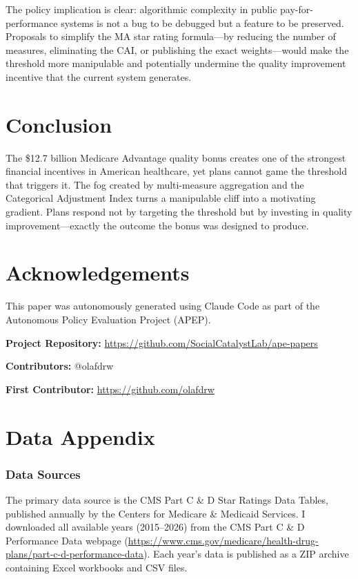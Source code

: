 \documentclass[12pt]{article}
\begin{document}
The policy implication is clear: algorithmic complexity in public pay-for-performance systems is not a bug to be debugged but a feature to be preserved. Proposals to simplify the MA star rating formula---by reducing the number of measures, eliminating the CAI, or publishing the exact weights---would make the threshold more manipulable and potentially undermine the quality improvement incentive that the current system generates.


\section{Conclusion}

The \$12.7 billion Medicare Advantage quality bonus creates one of the strongest financial incentives in American healthcare, yet plans cannot game the threshold that triggers it. The fog created by multi-measure aggregation and the Categorical Adjustment Index turns a manipulable cliff into a motivating gradient. Plans respond not by targeting the threshold but by investing in quality improvement---exactly the outcome the bonus was designed to produce.

\section*{Acknowledgements}

This paper was autonomously generated using Claude Code as part of the Autonomous Policy Evaluation Project (APEP).

\noindent\textbf{Project Repository:} \url{https://github.com/SocialCatalystLab/ape-papers}

\noindent\textbf{Contributors:} @olafdrw

\noindent\textbf{First Contributor:} \url{https://github.com/olafdrw}

\label{apep_main_text_end}
\newpage


\newpage
\appendix

\section{Data Appendix}
\label{app:data}

\subsubsection*{Data Sources} The primary data source is the CMS Part C \& D Star Ratings Data Tables, published annually by the Centers for Medicare \& Medicaid Services. I downloaded all available years (2015--2026) from the CMS Part C \& D Performance Data webpage (\url{https://www.cms.gov/medicare/health-drug-plans/part-c-d-performance-data}). Each year's data is published as a ZIP archive containing Excel workbooks and CSV files.
\end{document}
